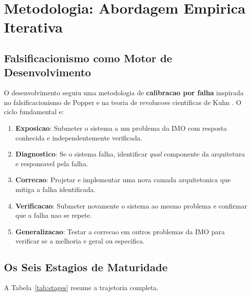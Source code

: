 \documentclass[5p]{elsarticle}
\begin{document}
\section{Metodologia: Abordagem Empirica Iterativa}

\subsection{Falsificacionismo como Motor de Desenvolvimento}

O desenvolvimento seguiu uma metodologia de \textbf{calibracao por falha}
inspirada no falsificacionismo de Popper \cite{popper1959} e na teoria de
revolucoes cientificas de Kuhn \cite{kuhn1962}. O ciclo fundamental e:

\begin{enumerate}[label=(\arabic*)]
  \item \textbf{Exposicao}: Submeter o sistema a um problema da IMO com
    resposta conhecida e independentemente verificada.
  \item \textbf{Diagnostico}: Se o sistema falha, identificar \textit{qual}
    componente da arquitetura e responsavel pela falha.
  \item \textbf{Correcao}: Projetar e implementar uma nova camada arquitetonica
    que mitiga a falha identificada.
  \item \textbf{Verificacao}: Submeter novamente o sistema ao mesmo problema
    e confirmar que a falha nao se repete.
  \item \textbf{Generalizacao}: Testar a correcao em outros problemas da IMO
    para verificar se a melhoria e geral ou especifica.
\end{enumerate}

\subsection{Os Seis Estagios de Maturidade}

A Tabela~\ref{tab:stages} resume a trajetoria completa.
\end{document}
